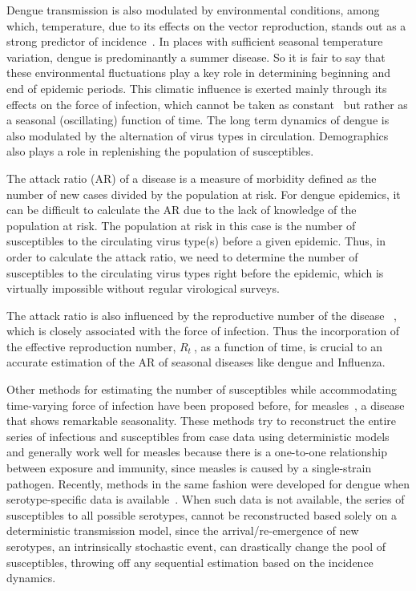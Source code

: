 \documentclass[10pt]{article}
\def \rr {$R_{t}\:$}
\begin{document}
Dengue transmission is also modulated by environmental conditions, among which, 
temperature, due to its effects on the 
vector reproduction, stands out as a strong predictor of 
incidence~\citep{honorio_temporal_2009,wu_higher_2009}.
In places with sufficient seasonal temperature variation, dengue is 
predominantly a  summer disease.
So it is fair to say that these environmental 
fluctuations play a key role in determining beginning and end of epidemic 
periods.
This climatic influence is exerted mainly through its effects on the force of 
infection, which cannot be taken as constant~\citep{reiner_time-varying_2014} 
but rather as a seasonal (oscillating) function of time.
The long term dynamics of dengue is also modulated by the alternation of virus 
types in circulation. Demographics also plays a role in replenishing the 
population of susceptibles. 

The attack ratio (AR) of a disease is a measure of morbidity defined as the 
number of new cases divided by the population at risk.
For dengue epidemics, it can be difficult to calculate the AR due 
to the lack of knowledge of the population at risk.
The population at risk in this case is the number of susceptibles 
to the circulating virus type(s) before a given epidemic. 
Thus, in order to calculate the attack ratio, we need to determine the number 
of susceptibles to the circulating virus types right before the epidemic, which 
is virtually impossible without regular virological surveys.

The attack ratio is also influenced by the reproductive number of the disease 
~\citep{bacaer_final_2009, katriel_attack_2012}, which is closely associated 
with the force of infection.
Thus the incorporation of the effective reproduction number, \rr, as a function 
of time, is crucial to an accurate estimation of the AR of seasonal diseases 
like dengue and Influenza.

Other methods for estimating the  number of susceptibles while 
accommodating time-varying force of infection have been proposed 
before, for measles~\citep{bjornstad_dynamics_2002, 
wallinga_reconstruction_2003}, a disease that shows remarkable seasonality.
These methods try to reconstruct the entire 
series of infectious and susceptibles from case data using deterministic models 
and generally work well for measles because there is a one-to-one 
relationship between exposure and immunity, since measles is caused by a 
single-strain pathogen.
Recently, methods in the same fashion were developed for dengue when 
serotype-specific data is available~\citep{Reiner2014}.
When such data is not available, the series of susceptibles to all possible
serotypes, cannot be reconstructed based solely on a deterministic transmission 
model, since the arrival/re-emergence of  new serotypes, an intrinsically 
stochastic event, can drastically change the pool of susceptibles, throwing off 
any sequential estimation based on the  incidence dynamics.
\end{document}

